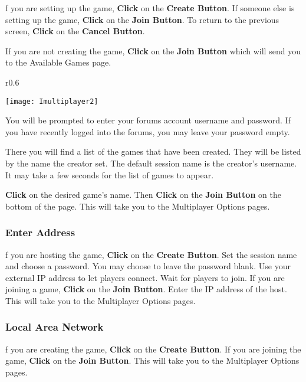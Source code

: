 f you are setting up the game, \textbf{Click} on the \textbf{Create Button}. If someone else is setting up the game, \textbf{Click} on the \textbf{Join Button}. To return to the previous screen, \textbf{Click} on the \textbf{Cancel Button}.

If you are not creating the game, \textbf{Click} on the \textbf{Join Button} which will send you to the Available Games page.

\begin{wrapfigure}{r}{0.6\textwidth}
	\begin{center}
		\vspace{-20pt}
		\texttt{[image: Imultiplayer2]} %
	\end{center}
	\vspace{-20pt}
\end{wrapfigure}

You will be prompted to enter your forums account username and password. If you have recently logged into the forums, you may leave your password empty.

There you will find a list of the games that have been created. They will be listed by the name the creator set. The default session name is the creator’s username. It may take a few seconds for the list of games to appear.

\textbf{Click} on the desired game’s name. Then \textbf{Click} on the \textbf{Join Button} on the bottom of the page. This will take you to the Multiplayer Options pages.

\subsubsection{\textsf{Enter Address}}

f you are hosting the game, \textbf{Click} on the \textbf{Create Button}. Set the session name and choose a password. You may choose to leave the password blank. Use your external IP address to let players connect. Wait for players to join. If you are joining a game, \textbf{Click} on the \textbf{Join Button}. Enter the IP address of the host. This will take you to the Multiplayer Options pages.

\subsubsection{\textsf{Local Area Network}}

f you are creating the game, \textbf{Click} on the \textbf{Create Button}. If you are joining the game, \textbf{Click} on the \textbf{Join Button}. This will take you to the Multiplayer Options pages.

